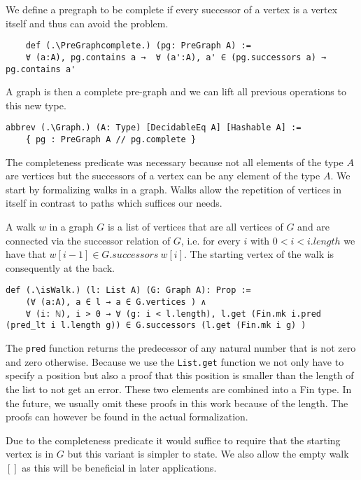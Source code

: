 We define a pregraph to be complete if every successor of a vertex is a vertex itself and thus can avoid the problem.

\begin{lstlisting}
    def (.\PreGraphcomplete.) (pg: PreGraph A) := 
    ∀ (a:A), pg.contains a →  ∀ (a':A), a' ∈ (pg.successors a) → pg.contains a'
\end{lstlisting}

A graph is then a complete pre-graph and we can lift all previous operations to this new type.
\begin{lstlisting}
abbrev (.\Graph.) (A: Type) [DecidableEq A] [Hashable A] := 
    { pg : PreGraph A // pg.complete }
\end{lstlisting}

The completeness predicate was necessary because not all elements of the type $A$ are vertices but the successors of a vertex can be any element of the type $A$.
We start by formalizing walks in a graph. Walks allow the repetition of vertices in itself in contrast to paths which suffices our needs. 

A walk $w$ in a graph $G$ is a list of vertices that are all vertices of $G$ and are connected via the successor relation of $G$, i.e. for every $i$ with $0 < i < i.length$ we have that $w[i-1] \in G.successors\ w[i]$. The starting vertex of the walk is consequently at the back.

\begin{lstlisting}
def (.\isWalk.) (l: List A) (G: Graph A): Prop :=
    (∀ (a:A), a ∈ l → a ∈ G.vertices ) ∧ 
    ∀ (i: ℕ), i > 0 → ∀ (g: i < l.length), l.get (Fin.mk i.pred (pred_lt i l.length g)) ∈ G.successors (l.get (Fin.mk i g) )
\end{lstlisting}

The \lstinline|pred| function returns the predecessor of any natural number that is not zero and zero otherwise. Because we use the \lstinline|List.get| function we not only have to specify a position but also a proof that this position is smaller than the length of the list to not get an error. These two elements are combined into a Fin type. In the future, we usually omit these proofs in this work because of the length. The proofs can however be found in the actual formalization.

Due to the completeness predicate it would suffice to require that the starting vertex is in $G$ but this variant is simpler to state. We also allow the empty walk $[]$ as this will be beneficial in later applications.

